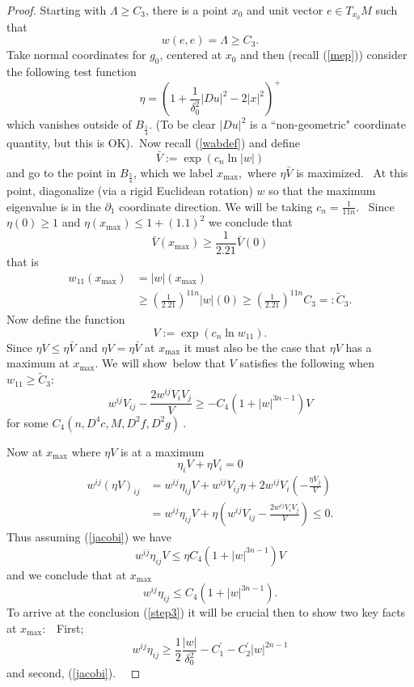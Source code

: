 \documentclass[11pt,letterpaper]{amsart}%
\numberwithin{equation}{section}
\begin{document}
\begin{proof}
Starting with $\Lambda\geq C_{3}$, there is a point $x_{0}$ and unit vector $e \in T_{x_0}M$  such that
\[
w(e,e)=\Lambda\geq C_{3}.
\]
Take normal coordinates for $g_{0}$, centered at $x_{0}$ and then (recall
(\ref{mep})) consider the following test function
\[
\eta=\left(  1+\frac{1}{\delta_{0}^{2}}|Du|^{2}-2|x|^{2}\right)  ^{+}%
\]
which vanishes outside of $B_{\frac{5}{4}}.$ (To be clear $|Du|^{2}$ is a
\textquotedblleft non-geometric" coordinate quantity, but this is OK).\ Now recall (\ref{wabdef}) and define
\[
\bar{V}:=\exp\left(  c_{n}\ln\left\vert w\right\vert \right)
\]
and go to the point in $B_{\frac{5}{4}}$, which we label $x_{\max},$ where $\eta\bar{V}$ is maximized. \ At this point, diagonalize (via a rigid Euclidean rotation) $w$ so that the maximum eigenvalue
is in the $\partial_{1}$ coordinate direction. We will be taking $c_{n}%
=\frac{1}{11n}.$ \ Since $\eta(0)\geq1$ and $\eta(x_{\max})\leq1+\left(
1.1\right)  ^{2}$ we conclude that
\[
\bar{V}(x_{\max})\geq\frac{1}{2.21}\bar{V}(0)
\]
that is
\begin{align}
w_{11}(x_{\max})  &  =\left\vert w\right\vert (x_{\max})\nonumber\\
&  \geq\left(  \frac{1}{2.21}\right)  ^{11n}\left\vert w\right\vert
(0)\geq\left(  \frac{1}{2.21}\right)  ^{11n}C_{3}=:\tilde{C}_{3}. \label{cmui}%
\end{align}
Now define the function \
\[
V:=\exp\left(  c_{n}\ln w_{11}\right)  .
\]
Since $\eta V\leq\eta\bar{V}$ and $\eta V=\eta\bar{V}$ at $x_{\max}$ it must
also be the case that $\eta V$ has a maximum at $x_{\max}$. We will
show\ below that $V$ satisfies the following when $w_{11}\geq\tilde{C}_{3}:$
\begin{equation}
w^{ij}V_{ij}-\frac{2w^{ij}V_{i}V_{j}}{V}\geq-C_{4}\left(  1+\left\vert
w\right\vert ^{3n-1}\right)  V \label{jacobi}%
\end{equation}
for some $C_{4}(n,D^{4}c,M,D^{2}f,D^{2}g)\ $.

Now at $x_{\max}$ where $\eta V$ is at a maximum
\[
\eta_{i}V+\eta V_{i}=0
\]%
\begin{align*}
w^{ij}(\eta V)_{ij}  &  =w^{ij}\eta_{ij}V+w^{ij}V_{ij}\eta+2w^{ij}V_{i}\left(
-\frac{\eta V_{j}}{V}\right) \\
&  =w^{ij}\eta_{ij}V+\eta\left(  w^{ij}V_{ij}-\frac{2w^{ij}V_{i}V_{j}}%
{V}\right)  \leq0.
\end{align*}
Thus assuming (\ref{jacobi}) we have
\[
w^{ij}\eta_{ij}V\leq\eta C_{4}\left(  1+\left\vert w\right\vert ^{3n-1}%
\right)  V
\]
and we conclude that at $x_{\max}$
\begin{equation}
w^{ij}\eta_{ij}\leq C_{4}\left(  1+\left\vert w\right\vert ^{3n-1}\right)  .
\label{cl0}%
\end{equation}
To arrive at the conclusion (\ref{step3}) it will be crucial then to show two
key facts at $x_{\max}$:\ \ First;
\begin{equation}
w^{ij}\eta_{ij}\geq\frac{1}{2}\frac{\left\vert w\right\vert }{\delta_{0}^{2}%
}-C_{1}^{\prime}-C_{2}^{\prime}|w|^{2n-1} \label{cl1}%
\end{equation}
and second, (\ref{jacobi}). \ 


\end{proof}
\end{document}
